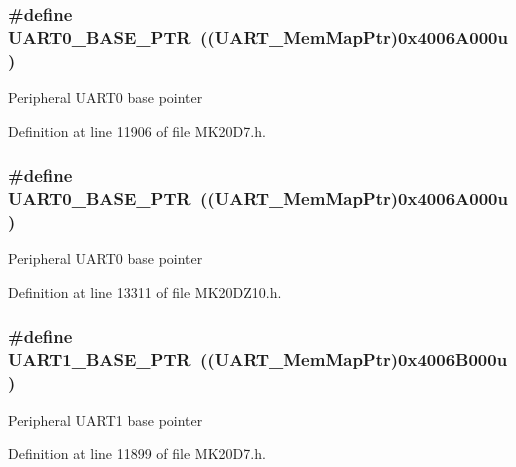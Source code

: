 \subsubsection[{\texorpdfstring{U\+A\+R\+T0\+\_\+\+B\+A\+S\+E\+\_\+\+P\+TR}{UART0_BASE_PTR}}]{\setlength{\rightskip}{0pt plus 5cm}\#define U\+A\+R\+T0\+\_\+\+B\+A\+S\+E\+\_\+\+P\+TR~(({\bf U\+A\+R\+T\+\_\+\+Mem\+Map\+Ptr})0x4006\+A000u)}\hypertarget{group___u_a_r_t___peripheral_ga50a02c91ffbd11fa7b4f0c33fe585199}{}\label{group___u_a_r_t___peripheral_ga50a02c91ffbd11fa7b4f0c33fe585199}
Peripheral U\+A\+R\+T0 base pointer 

Definition at line 11906 of file M\+K20\+D7.\+h.

\subsubsection[{\texorpdfstring{U\+A\+R\+T0\+\_\+\+B\+A\+S\+E\+\_\+\+P\+TR}{UART0_BASE_PTR}}]{\setlength{\rightskip}{0pt plus 5cm}\#define U\+A\+R\+T0\+\_\+\+B\+A\+S\+E\+\_\+\+P\+TR~(({\bf U\+A\+R\+T\+\_\+\+Mem\+Map\+Ptr})0x4006\+A000u)}\hypertarget{group___u_a_r_t___peripheral_ga50a02c91ffbd11fa7b4f0c33fe585199}{}\label{group___u_a_r_t___peripheral_ga50a02c91ffbd11fa7b4f0c33fe585199}
Peripheral U\+A\+R\+T0 base pointer 

Definition at line 13311 of file M\+K20\+D\+Z10.\+h.

\subsubsection[{\texorpdfstring{U\+A\+R\+T1\+\_\+\+B\+A\+S\+E\+\_\+\+P\+TR}{UART1_BASE_PTR}}]{\setlength{\rightskip}{0pt plus 5cm}\#define U\+A\+R\+T1\+\_\+\+B\+A\+S\+E\+\_\+\+P\+TR~(({\bf U\+A\+R\+T\+\_\+\+Mem\+Map\+Ptr})0x4006\+B000u)}\hypertarget{group___u_a_r_t___peripheral_gafb5b1236c1cdf2d9a6464251b791030c}{}\label{group___u_a_r_t___peripheral_gafb5b1236c1cdf2d9a6464251b791030c}
Peripheral U\+A\+R\+T1 base pointer 

Definition at line 11899 of file M\+K20\+D7.\+h.

